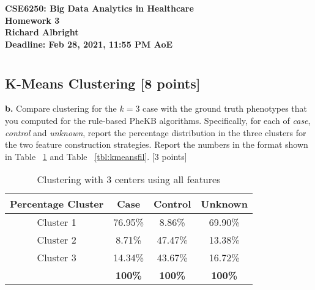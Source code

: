 \documentclass[12pt]{article}
\begin{document}
{\centering 
\textbf{CSE6250: Big Data Analytics in Healthcare \\ 
Homework 3 \\
Richard Albright \\
Deadline: Feb 28, 2021, 11:55 PM AoE \\}
\par
}

\section{}
\section{}
\subsection{}
\subsection{}

\subsection{K-Means Clustering [8 points] } 

\textbf{b.} Compare clustering for the $k=3$ case with the ground truth phenotypes that you computed for the rule-based PheKB algorithms. Specifically, for each of \textit{case}, \textit{control} and \textit{unknown}, report the percentage distribution in the three clusters for the two feature construction strategies. Report the numbers in the format shown in Table ~\ref{tbl:kmeansall} and Table ~\ref{tbl:kmeansfil}. [3 points]\\

\begin{table}[h]
\centering
\begin{tabular}{ c | c | c | c }
  \hline
  Percentage Cluster & Case & Control & Unknown\\
  \hline                       
  Cluster 1 & 76.95\% & 8.86\% & 69.90\% \\
  Cluster 2 & 8.71\% & 47.47\% & 13.38\% \\
  Cluster 3 & 14.34\% & 43.67\% & 16.72\% \\
  \hline  
   & \bf{100\%} & \bf{100\%} & \bf{100\%} \\
  \hline  
\end{tabular}
\caption{Clustering with 3 centers using all features}
\label{tbl:kmeansall}
\end{table}
\end{document}
